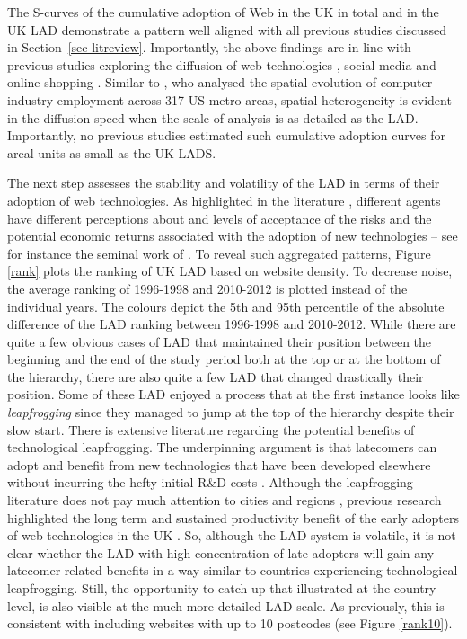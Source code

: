 \documentclass[
  authoryear,
  preprint,
  3p]{elsarticle}
\begin{document}
The S-curves of the cumulative adoption of Web in the UK in total and in
the UK LAD demonstrate a pattern well aligned with all previous studies
discussed in Section~\ref{sec-litreview}. Importantly, the above
findings are in line with previous studies exploring the diffusion of
web technologies \citep{PAPAGIANNIDIS2015308}, social media
\citep{lengyel2020role} and online shopping \citep{bakher2013diffusion}.
Similar to \citet{beardsell1999spatial}, who analysed the spatial
evolution of computer industry employment across 317 US metro areas,
spatial heterogeneity is evident in the diffusion speed when the scale
of analysis is as detailed as the LAD. Importantly, no previous studies
estimated such cumulative adoption curves for areal units as small as
the UK LADS.

The next step assesses the stability and volatility of the LAD in terms
of their adoption of web technologies. As highlighted in the literature
\citep{risk_perceptions}, different agents have different perceptions
about and levels of acceptance of the risks and the potential economic
returns associated with the adoption of new technologies -- see for
instance the seminal work of \citet{venkatesh2000theoretical}. To reveal
such aggregated patterns, Figure \ref{rank} plots the ranking of UK LAD
based on website density. To decrease noise, the average ranking of
1996-1998 and 2010-2012 is plotted instead of the individual years. The
colours depict the 5th and 95th percentile of the absolute difference of
the LAD ranking between 1996-1998 and 2010-2012. While there are quite a
few obvious cases of LAD that maintained their position between the
beginning and the end of the study period both at the top or at the
bottom of the hierarchy, there are also quite a few LAD that changed
drastically their position. Some of these LAD enjoyed a process that at
the first instance looks like \emph{leapfrogging} since they managed to
jump at the top of the hierarchy despite their slow start. There is
extensive literature regarding the potential benefits of technological
leapfrogging. The underpinning argument is that latecomers can adopt and
benefit from new technologies that have been developed elsewhere without
incurring the hefty initial R\&D costs \citep{teece2008firm}. Although
the leapfrogging literature does not pay much attention to cities and
regions \citep{yu2018sustainability}, previous research highlighted the
long term and sustained productivity benefit of the early adopters of
web technologies in the UK \citep{tranosuk}. So, although the LAD system
is volatile, it is not clear whether the LAD with high concentration of
late adopters will gain any latecomer-related benefits in a way similar
to countries experiencing technological leapfrogging. Still, the
opportunity to catch up that \citet{perkins2005international}
illustrated at the country level, is also visible at the much more
detailed LAD scale. As previously, this is consistent with including
websites with up to 10 postcodes (see Figure \ref{rank10}).
\end{document}
